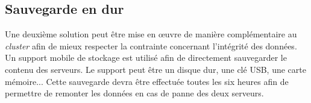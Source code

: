 \subsection{Sauvegarde en dur}
Une deuxième solution peut être mise en œuvre de manière complémentaire au \emph{cluster} afin de mieux respecter la contrainte concernant l'intégrité des données.
Un support mobile de stockage est utilisé afin de directement sauvegarder le contenu des serveurs.
Le support peut être un disque dur, une clé USB, une carte mémoire...
Cette sauvegarde devra être effectuée toutes les six heures afin de permettre de remonter les données en cas de panne des deux serveurs.  
